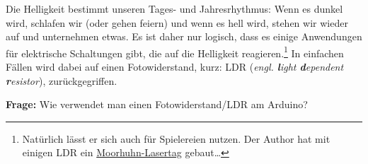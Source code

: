 Die Helligkeit bestimmt unseren Tages- und Jahresrhythmus: Wenn es dunkel wird, schlafen wir (oder gehen feiern) und wenn es hell wird, stehen wir wieder auf und unternehmen etwas. Es ist daher nur logisch, dass es einige Anwendungen für elektrische Schaltungen gibt, die auf die Helligkeit reagieren.\footnote{Natürlich lässt er sich auch für Spielereien nutzen. Der Author hat mit einigen LDR ein \href{https://www.el-voss.de/?p=159}{Moorhuhn-Lasertag} gebaut\dots} In einfachen Fällen wird dabei auf einen Fotowiderstand, kurz: LDR (\emph{engl. \textbf{l}ight \textbf{d}ependent \textbf{r}esistor}), zurückgegriffen.

\begin{ziel}
	\textbf{Frage:} Wie verwendet man einen Fotowiderstand/LDR am Arduino?
\end{ziel}

